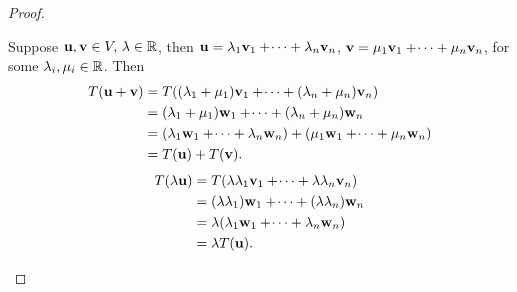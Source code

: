 \documentclass[10pt, a4paper]{article}
\begin{document}
\begin{lemma}
\begin{proof}
\begin{enumerate}[label = (\roman*)]
            Suppose $\mathbf{u, v} \in V,\, \lambda \in \mathbb{R}$,
            then $\mathbf{u} = \lambda_1\mathbf{v}_1 + \dotsi + \lambda_n\mathbf{v}_n$,
            $\mathbf{v} = \mu_1\mathbf{v}_1 + \dotsi + \mu_n\mathbf{v}_n$,
            for some $\lambda_i, \mu_i \in \mathbb{R}$.
            Then
            \begin{align*}
                T(\mathbf{u + v}) &= T((\lambda_1 + \mu_1)\mathbf{v}_1 + \dotsi + (\lambda_n + \mu_n)\mathbf{v}_n) \\
                &= (\lambda_1 + \mu_1)\mathbf{w}_1 + \dotsi + (\lambda_n + \mu_n)\mathbf{w}_n \\
                &= (\lambda_1\mathbf{w}_1 + \dotsi + \lambda_n\mathbf{w}_n) + (\mu_1\mathbf{w}_1 + \dotsi + \mu_n\mathbf{w}_n) \\
                &= T(\mathbf{u}) + T(\mathbf{v}).
            \end{align*}
            \begin{align*}
                T(\lambda\mathbf{u}) &= T(\lambda\lambda_1\mathbf{v}_1 + \dotsi + \lambda\lambda_n\mathbf{v}_n) \\
                &= (\lambda\lambda_1)\mathbf{w}_1 + \dotsi + (\lambda\lambda_n)\mathbf{w}_n \\
                &= \lambda(\lambda_1\mathbf{w}_1 + \dotsi + \lambda_n\mathbf{w}_n) \\
                &= \lambda T(\mathbf{u}).
            \end{align*}
        \end{enumerate}
    \end{proof}
\end{lemma}
\end{document}
